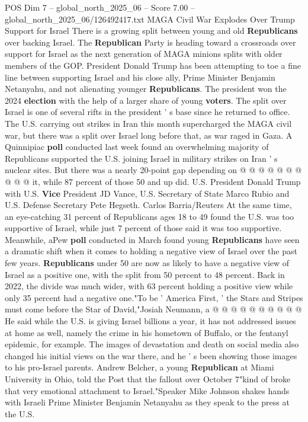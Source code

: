 \begin{textsample}{POS Dim 7 – global\_north\_2025\_06 – Score 7.00 – global\_north\_2025\_06/126492417.txt}  \label{ex:f7_pos_377}
MAGA Civil War Explodes Over Trump Support for Israel There is a growing split between young and old \textbf{Republicans} over backing Israel.
The \textbf{Republican} Party is heading toward a crossroads over support for Israel as the next generation of MAGA minions splits with older members of the GOP.
President Donald Trump has been attempting to toe a fine line between supporting Israel and his close ally, Prime Minister Benjamin Netanyahu, and not alienating younger \textbf{Republicans}.
The president won the 2024 \textbf{election} with the help of a larger share of young \textbf{voters}.
The split over Israel is one of several rifts in the president ' s base since he returned to office.
The U.S. carrying out strikes in Iran this month supercharged the MAGA civil war, but there was a split over Israel long before that, as war raged in Gaza.
A Quinnipiac \textbf{poll} conducted last week found an overwhelming majority of Republicans supported the U.S. joining Israel in military strikes on Iran ' s nuclear sites.
But there was a nearly 20-point gap depending on @ @ @ @ @ @ @ @ @ @ it, while 87 percent of those 50 and up did.
U.S.
President Donald Trump with U.S. \textbf{Vice} President JD Vance, U.S.
Secretary of State Marco Rubio and U.S.
Defense Secretary Pete Hegseth.
Carlos Barria/Reuters At the same time, an eye-catching 31 percent of Republicans ages 18 to 49 found the U.S. was too supportive of Israel, while just 7 percent of those said it was too supportive.
Meanwhile, aPew \textbf{poll} conducted in March found young \textbf{Republicans} have seen a dramatic shift when it comes to holding a negative view of Israel over the past few years. \textbf{Republicans} under 50 are now as likely to have a negative view of Israel as a positive one, with the split from 50 percent to 48 percent.
Back in 2022, the divide was much wider, with 63 percent holding a positive view while only 35 percent had a negative one."To be ' America First, ' the Stars and Stripes must come before the Star of David,"Josiah Neumann, a @ @ @ @ @ @ @ @ @ @ He said while the U.S. is giving Israel billions a year, it has not addressed issues at home as well, namely the crime in his hometown of Buffalo, or the fentanyl epidemic, for example.
The images of devastation and death on social media also changed his initial views on the war there, and he ' s been showing those images to his pro-Israel parents.
Andrew Belcher, a young \textbf{Republican} at Miami University in Ohio, told the Post that the fallout over October 7"kind of broke that very emotional attachment to Israel."Speaker Mike Johnson shakes hands with Israeli Prime Minister Benjamin Netanyahu as they speak to the press at the U.S.

\end{textsample}
